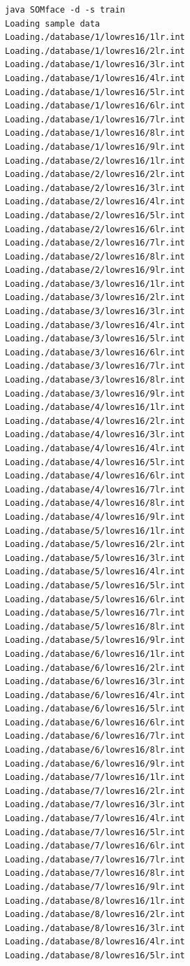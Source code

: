 \documentclass[a4paper,11pt,titlepage]{article}
\begin{document}
\begin{verbatim}
java SOMface -d -s train
Loading sample data
Loading./database/1/lowres16/1lr.int
Loading./database/1/lowres16/2lr.int
Loading./database/1/lowres16/3lr.int
Loading./database/1/lowres16/4lr.int
Loading./database/1/lowres16/5lr.int
Loading./database/1/lowres16/6lr.int
Loading./database/1/lowres16/7lr.int
Loading./database/1/lowres16/8lr.int
Loading./database/1/lowres16/9lr.int
Loading./database/2/lowres16/1lr.int
Loading./database/2/lowres16/2lr.int
Loading./database/2/lowres16/3lr.int
Loading./database/2/lowres16/4lr.int
Loading./database/2/lowres16/5lr.int
Loading./database/2/lowres16/6lr.int
Loading./database/2/lowres16/7lr.int
Loading./database/2/lowres16/8lr.int
Loading./database/2/lowres16/9lr.int
Loading./database/3/lowres16/1lr.int
Loading./database/3/lowres16/2lr.int
Loading./database/3/lowres16/3lr.int
Loading./database/3/lowres16/4lr.int
Loading./database/3/lowres16/5lr.int
Loading./database/3/lowres16/6lr.int
Loading./database/3/lowres16/7lr.int
Loading./database/3/lowres16/8lr.int
Loading./database/3/lowres16/9lr.int
Loading./database/4/lowres16/1lr.int
Loading./database/4/lowres16/2lr.int
Loading./database/4/lowres16/3lr.int
Loading./database/4/lowres16/4lr.int
Loading./database/4/lowres16/5lr.int
Loading./database/4/lowres16/6lr.int
Loading./database/4/lowres16/7lr.int
Loading./database/4/lowres16/8lr.int
Loading./database/4/lowres16/9lr.int
Loading./database/5/lowres16/1lr.int
Loading./database/5/lowres16/2lr.int
Loading./database/5/lowres16/3lr.int
Loading./database/5/lowres16/4lr.int
Loading./database/5/lowres16/5lr.int
Loading./database/5/lowres16/6lr.int
Loading./database/5/lowres16/7lr.int
Loading./database/5/lowres16/8lr.int
Loading./database/5/lowres16/9lr.int
Loading./database/6/lowres16/1lr.int
Loading./database/6/lowres16/2lr.int
Loading./database/6/lowres16/3lr.int
Loading./database/6/lowres16/4lr.int
Loading./database/6/lowres16/5lr.int
Loading./database/6/lowres16/6lr.int
Loading./database/6/lowres16/7lr.int
Loading./database/6/lowres16/8lr.int
Loading./database/6/lowres16/9lr.int
Loading./database/7/lowres16/1lr.int
Loading./database/7/lowres16/2lr.int
Loading./database/7/lowres16/3lr.int
Loading./database/7/lowres16/4lr.int
Loading./database/7/lowres16/5lr.int
Loading./database/7/lowres16/6lr.int
Loading./database/7/lowres16/7lr.int
Loading./database/7/lowres16/8lr.int
Loading./database/7/lowres16/9lr.int
Loading./database/8/lowres16/1lr.int
Loading./database/8/lowres16/2lr.int
Loading./database/8/lowres16/3lr.int
Loading./database/8/lowres16/4lr.int
Loading./database/8/lowres16/5lr.int

\end{verbatim}
\end{document}
